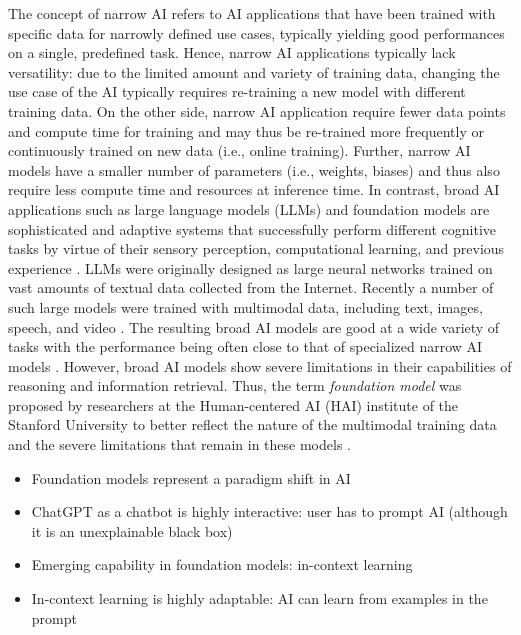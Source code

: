 The concept of narrow AI refers to AI applications that have been trained with specific data for narrowly defined use
cases, typically yielding good performances on a single, predefined task. Hence, narrow AI applications typically lack
versatility: due to the limited amount and variety of training data, changing the use case of the AI typically
requires re-training a new model with different training data. On the other side, narrow AI application require fewer
data points and compute time for training and may thus be re-trained more frequently or continuously trained on new data
(i.e., online training). Further, narrow AI models have a smaller number of parameters (i.e., weights, biases) and
thus also require less compute time and resources at inference time. In contrast, broad AI applications such
as large language models (LLMs) and foundation models are sophisticated and adaptive systems that successfully perform
different cognitive tasks by virtue of their sensory perception, computational learning, and previous
experience \citep{hochreiterBroadAI2022}. LLMs were originally designed as large neural networks trained on vast amounts
of textual data collected from the Internet. Recently a number of such large models were trained with multimodal data,
including text, images, speech, and video \citep{bommasaniOpportunitiesRisksFoundation2022}. The resulting broad AI models
are good at a wide variety of tasks with the performance being often close to that of specialized narrow AI models
\citep{bommasaniOpportunitiesRisksFoundation2022}. However, broad AI models show severe limitations in their capabilities
of reasoning and information retrieval. Thus, the term \textit{foundation model} was proposed by researchers at
the Human-centered AI (HAI) institute of the Stanford University to better reflect the nature of the multimodal 
training data and the severe limitations that remain in these models \citep{bommasaniOpportunitiesRisksFoundation2022}.



\begin{itemize}
    \item Foundation models represent a paradigm shift in AI
    \item ChatGPT as a chatbot is highly interactive: user has to prompt AI (although it is an unexplainable black box)
    \item Emerging capability in foundation models: in-context learning 
    \item In-context learning is highly adaptable: AI can learn from examples in the prompt 
\end{itemize}



